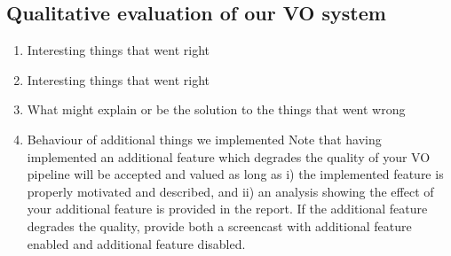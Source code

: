 \documentclass[fleqn,10pt]{olplainarticle}
\begin{document}
\subsection{Qualitative evaluation of our VO system}
\begin{enumerate}
    \item Interesting things that went right
    \item Interesting things that went right
    \item What might explain or be the solution to the things that went wrong
    \item Behaviour of additional things we implemented
    Note that having implemented an additional feature which degrades the quality of your VO pipeline will be accepted and valued as long as i) the implemented feature is properly motivated and described, and ii) an analysis showing the effect of your additional feature is provided in the report. If the additional feature degrades the quality, provide both a screencast with additional feature enabled and additional feature disabled.
\end{enumerate}

%


\end{document}
